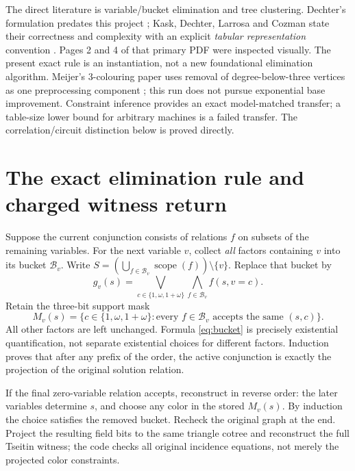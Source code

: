 \documentclass[11pt]{article}
\newcommand{\C}{\{1,\omega,1+\omega\}}
\begin{document}
The direct literature is variable/bucket elimination and tree clustering.
Dechter's formulation predates this project \cite{dechter}; Kask, Dechter,
Larrosa and Cozman state their correctness and complexity with an explicit
\emph{tabular representation} convention \cite{kask}. Pages 2 and 4 of that
primary PDF were inspected visually. The present exact rule is an
instantiation, not a new foundational elimination algorithm. Meijer's
3-colouring paper uses removal of degree-below-three vertices as one
preprocessing component \cite{meijer}; this run does not pursue exponential
base improvement. Constraint inference provides an exact model-matched
transfer; a table-size lower bound for arbitrary machines is a failed
transfer. The correlation/circuit distinction below is proved directly.

\section{The exact elimination rule and charged witness return}
Suppose the current conjunction consists of relations $f$ on subsets of the
remaining variables. For the next variable $v$, collect \emph{all} factors
containing $v$ into its bucket $\mathcal B_v$. Write
$S=(\bigcup_{f\in\mathcal B_v}\operatorname{scope}(f))\setminus\{v\}$.
Replace that bucket by
\begin{equation}\label{eq:bucket}
 g_v(s)=\bigvee_{c\in\C}\bigwedge_{f\in\mathcal B_v} f(s,v=c).
\end{equation}
Retain the three-bit support mask
\[
 M_v(s)=\{c\in\C:\text{every }f\in\mathcal B_v
                       \text{ accepts the same }(s,c)\}.
\]
All other factors are left unchanged. Formula \eqref{eq:bucket} is precisely
existential quantification, not separate existential choices for different
factors. Induction proves that after any prefix of the order, the active
conjunction is exactly the projection of the original solution relation.

If the final zero-variable relation accepts, reconstruct in reverse order:
the later variables determine $s$, and choose any color in the stored
$M_v(s)$. By induction the choice satisfies the removed bucket. Recheck the
original graph at the end. Project the resulting field bits to the same
triangle cotree and reconstruct the full Tseitin witness; the code checks
all original incidence equations, not merely the projected color constraints.
\end{document}
